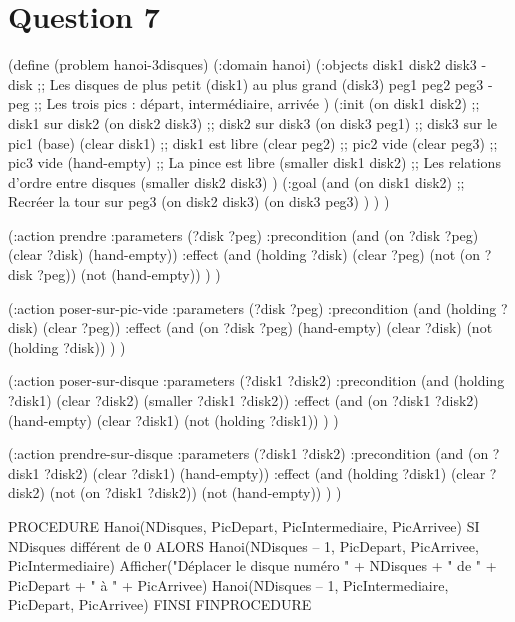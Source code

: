 \documentclass[../CSC_5RO16_TA_TP5.tex]{subfiles}
\begin{document}
\section{Question 7}
% 

(define (problem hanoi-3disques)
  (:domain hanoi)
  (:objects
    disk1 disk2 disk3 - disk ;; Les disques de plus petit (disk1) au plus grand (disk3)
    peg1 peg2 peg3 - peg      ;; Les trois pics : départ, intermédiaire, arrivée
  )
  (:init
    (on disk1 disk2)          ;; disk1 sur disk2
    (on disk2 disk3)          ;; disk2 sur disk3
    (on disk3 peg1)           ;; disk3 sur le pic1 (base)
    (clear disk1)             ;; disk1 est libre
    (clear peg2)              ;; pic2 vide
    (clear peg3)              ;; pic3 vide
    (hand-empty)              ;; La pince est libre
    (smaller disk1 disk2)     ;; Les relations d'ordre entre disques
    (smaller disk2 disk3)
  )
  (:goal
    (and 
      (on disk1 disk2)        ;; Recréer la tour sur peg3
      (on disk2 disk3)
      (on disk3 peg3)
    )
  )
)


(:action prendre
  :parameters (?disk ?peg)
  :precondition (and (on ?disk ?peg) (clear ?disk) (hand-empty))
  :effect (and 
            (holding ?disk)
            (clear ?peg)
            (not (on ?disk ?peg))
            (not (hand-empty))
          )
)


(:action poser-sur-pic-vide
  :parameters (?disk ?peg)
  :precondition (and (holding ?disk) (clear ?peg))
  :effect (and 
            (on ?disk ?peg)
            (hand-empty)
            (clear ?disk)
            (not (holding ?disk))
          )
)


(:action poser-sur-disque
  :parameters (?disk1 ?disk2)
  :precondition (and (holding ?disk1) (clear ?disk2) (smaller ?disk1 ?disk2))
  :effect (and 
            (on ?disk1 ?disk2)
            (hand-empty)
            (clear ?disk1)
            (not (holding ?disk1))
          )
)

(:action prendre-sur-disque
  :parameters (?disk1 ?disk2)
  :precondition (and (on ?disk1 ?disk2) (clear ?disk1) (hand-empty))
  :effect (and 
            (holding ?disk1)
            (clear ?disk2)
            (not (on ?disk1 ?disk2))
            (not (hand-empty))
          )
)


PROCEDURE Hanoi(NDisques, PicDepart, PicIntermediaire, PicArrivee)
  SI NDisques différent de 0 ALORS
    Hanoi(NDisques – 1, PicDepart, PicArrivee, PicIntermediaire)
    Afficher("Déplacer le disque numéro " + NDisques + " de " + PicDepart + " à " + PicArrivee)
    Hanoi(NDisques – 1, PicIntermediaire, PicDepart, PicArrivee)
  FINSI
FINPROCEDURE
\end{document}
